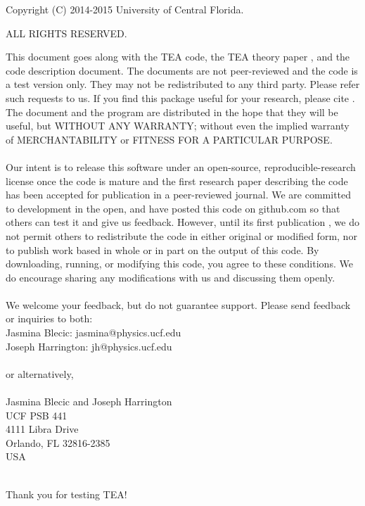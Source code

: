 \clearpage
\vspace*{\fill}
\begin{center}
\begin{minipage}{.8\textwidth}


\centerline{Copyright (C) 2014-2015 University of Central Florida.}
\centerline{ALL RIGHTS RESERVED.}

\vspace{20pt} This document goes along with the TEA code, the TEA theory
paper \citep{BlecicEtal2015-TEAtheory}, and the code description
document.  The documents are not peer-reviewed and the code is a test
version only. They may not be redistributed to any third party.
Please refer such requests to us.  If you find this package useful for
your research, please cite \citet{BlecicEtal2015-TEAtheory}.  The
document and the program are distributed in the hope that they will be
useful, but WITHOUT ANY WARRANTY; without even the implied warranty of
MERCHANTABILITY or FITNESS FOR A PARTICULAR PURPOSE. \\ \\ Our intent
is to release this software under an open-source,
reproducible-research license once the code is mature and the first
research paper describing the code has been accepted for publication
in a peer-reviewed journal.  We are committed to development in the
open, and have posted this code on github.com so that others can test
it and give us feedback.  However, until its first publication , we do
not permit others to redistribute the code in either original or
modified form, nor to publish work based in whole or in part on the
output of this code.  By downloading, running, or modifying this code,
you agree to these conditions.  We do encourage sharing any
modifications with us and discussing them openly.\\ \\ We welcome your
feedback, but do not guarantee support. Please send feedback or
inquiries to both:
\\ Jasmina Blecic: jasmina@physics.ucf.edu \\ Joseph Harrington:
jh@physics.ucf.edu \\ \\ or alternatively, \\ \\ Jasmina Blecic and
Joseph Harrington \\ UCF PSB 441 \\ 4111 Libra Drive
\\ Orlando, FL 32816-2385 \\ USA \\ \\ \centerline{Thank you for
  testing TEA!}
\end{minipage}
\end{center}
\vfill %
\clearpage


